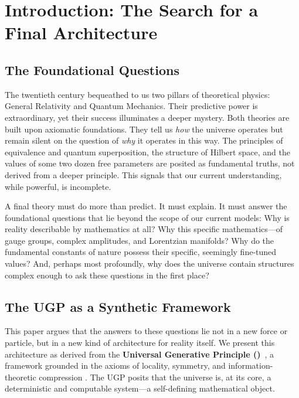 \documentclass[12pt]{article}
\newcommand{\UGP}{\text{UGP}}
\begin{document}
\tableofcontents
\newpage

\section{Introduction: The Search for a Final Architecture}
\label{sec:introduction}

\subsection{The Foundational Questions}
The twentieth century bequeathed to us two pillars of theoretical physics: General Relativity and Quantum Mechanics. Their predictive power is extraordinary, yet their success illuminates a deeper mystery. Both theories are built upon axiomatic foundations. They tell us \emph{how} the universe operates but remain silent on the question of \emph{why} it operates in this way. The principles of equivalence and quantum superposition, the structure of Hilbert space, and the values of some two dozen free parameters are posited as fundamental truths, not derived from a deeper principle. This signals that our current understanding, while powerful, is incomplete.

A final theory must do more than predict. It must explain. It must answer the foundational questions that lie beyond the scope of our current models: Why is reality describable by mathematics at all? Why this specific mathematics—of gauge groups, complex amplitudes, and Lorentzian manifolds? Why do the fundamental constants of nature possess their specific, seemingly fine-tuned values? And, perhaps most profoundly, why does the universe contain structures complex enough to ask these questions in the first place?

\subsection{The UGP as a Synthetic Framework}
This paper argues that the answers to these questions lie not in a new force or particle, but in a new kind of architecture for reality itself. We present this architecture as derived from the \textbf{Universal Generative Principle (\UGP)}~\cite{SpivackUGPFormalization,ugp-lean}, a framework grounded in the axioms of locality, symmetry, and information-theoretic compression \cite{Spivack2025UGP, SpivackUGPProgram}. The UGP posits that the universe is, at its core, a deterministic and computable system—a self-defining mathematical object.
\end{document}
